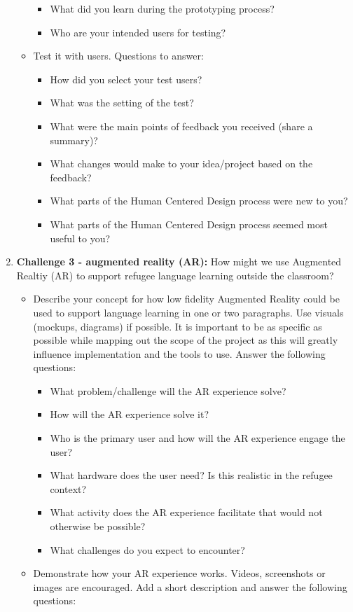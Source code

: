 \documentclass[12pt,twoside,vi]{mitthesis}
\begin{document}
\begin{enumerate}
\begin{itemize}
\begin{itemize}
\item What did you learn during the prototyping process?
\item Who are your intended users for testing?
\end{itemize}
\item Test it with users. Questions to answer:
\begin{itemize}
\item How did you select your test users? 
\item What was the setting of the test? 
\item What were the main points of feedback you received (share a summary)? 
\item What changes would make to your idea/project based on the feedback?
\item What parts of the Human Centered Design process were new to you?
\item What parts of the Human Centered Design process seemed most useful to you?
\end{itemize}
\end{itemize}
\item \textbf{Challenge 3 - augmented reality (AR):} How might we use Augmented Realtiy (AR) to support refugee language learning outside the classroom?
\begin{itemize}
\item Describe your concept for how low fidelity Augmented Reality could be used to support language learning in one or two paragraphs. Use visuals (mockups, diagrams) if possible. It is important to be as specific as possible while mapping out the scope of the project as this will greatly influence implementation and the tools to use. Answer the following questions:
\begin{itemize}
\item What problem/challenge will the AR experience solve? 
\item How will the AR experience solve it? 
\item Who is the primary user and how will the AR experience engage the user?
\item What hardware does the user need? Is this realistic in the refugee context? 
\item What activity does the AR experience facilitate that would not otherwise be possible? 
\item What challenges do you expect to encounter? 
\end{itemize}
\item Demonstrate how your AR experience works. Videos, screenshots or images are encouraged. Add a short description and answer the following questions: 

\end{itemize}
\end{enumerate}
\end{document}
